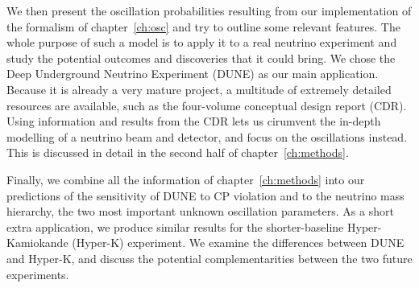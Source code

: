 We then present the oscillation probabilities resulting from our
implementation of the formalism of chapter~\ref{ch:osc} and try to outline some
relevant features. 
The whole purpose of such a model is to apply it to a real neutrino experiment
and study the potential outcomes and discoveries that it could bring.
We chose the Deep Underground Neutrino Experiment (DUNE) as our main
application. Because it is already a very mature project, a multitude of
extremely detailed resources are available, such as the four-volume conceptual
design report\cite{cdr-all} (CDR). Using information and results from the CDR
lets us cirumvent the in-depth modelling of a neutrino beam and detector, and
focus on the oscillations instead. This is discussed in detail in the second
half of chapter~\ref{ch:methods}.

Finally, we combine all the information of chapter~\ref{ch:methods} into our
predictions of the sensitivity of DUNE to CP violation and to the neutrino mass
hierarchy, the two most important unknown oscillation parameters.
As a short extra application, we produce similar results for the shorter-baseline
Hyper-Kamiokande (Hyper-K) experiment. We examine the differences between DUNE
and Hyper-K, and discuss the potential complementarities between the two
future experiments.

